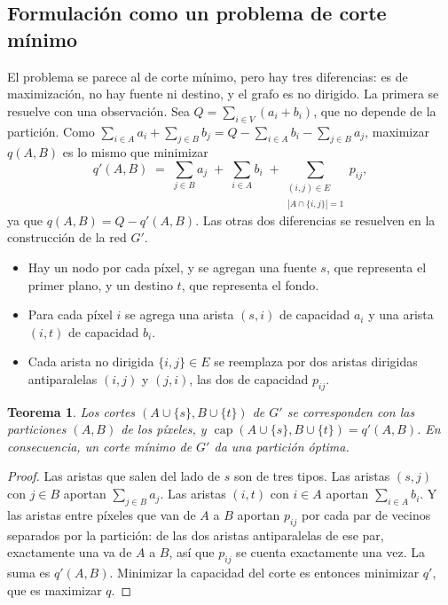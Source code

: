 \documentclass[12pt, spanish, oneside, openany]{book}
\theoremstyle{uprightplain}
\newtheorem{teorema}{Teorema}[section]
\theoremstyle{definition}
\theoremstyle{remark}
\theoremstyle{definition}
\newcommand{\capac}{\operatorname{cap}} %
\begin{document}
\subsection{Formulación como un problema de corte mínimo}

El problema se parece al de corte mínimo, pero hay tres diferencias: es de maximización, no hay fuente ni destino, y el grafo es no dirigido. La primera se resuelve con una observación. Sea $Q=\sum_{i\in V}(a_i+b_i)$, que no depende de la partición. Como $\sum_{i\in A}a_i+\sum_{j\in B}b_j=Q-\sum_{i\in A}b_i-\sum_{j\in B}a_j$, maximizar $q(A,B)$ es lo mismo que minimizar
\[
q'(A,B)\;=\;\sum_{j\in B}a_j\;+\;\sum_{i\in A}b_i\;+\sum_{\substack{(i,j)\in E\\ |A\cap\{i,j\}|=1}}p_{ij},
\]
ya que $q(A,B)=Q-q'(A,B)$. Las otras dos diferencias se resuelven en la construcción de la red $G'$.
\begin{itemize}
    \item Hay un nodo por cada píxel, y se agregan una fuente $s$, que representa el primer plano, y un destino $t$, que representa el fondo.
    \item Para cada píxel $i$ se agrega una arista $(s,i)$ de capacidad $a_i$ y una arista $(i,t)$ de capacidad $b_i$.
    \item Cada arista no dirigida $\{i,j\}\in E$ se reemplaza por dos aristas dirigidas antiparalelas $(i,j)$ y $(j,i)$, las dos de capacidad $p_{ij}$.
\end{itemize}

\begin{teorema}
\label{teo:flujo-segmentacion}
Los cortes $(A\cup\{s\},B\cup\{t\})$ de $G'$ se corresponden con las particiones $(A,B)$ de los píxeles, y $\capac(A\cup\{s\},B\cup\{t\})=q'(A,B)$. En consecuencia, un corte mínimo de $G'$ da una partición óptima.
\end{teorema}
\begin{proof}
Las aristas que salen del lado de $s$ son de tres tipos. Las aristas $(s,j)$ con $j\in B$ aportan $\sum_{j\in B}a_j$. Las aristas $(i,t)$ con $i\in A$ aportan $\sum_{i\in A}b_i$. Y las aristas entre píxeles que van de $A$ a $B$ aportan $p_{ij}$ por cada par de vecinos separados por la partición: de las dos aristas antiparalelas de ese par, exactamente una va de $A$ a $B$, así que $p_{ij}$ se cuenta exactamente una vez. La suma es $q'(A,B)$. Minimizar la capacidad del corte es entonces minimizar $q'$, que es maximizar $q$.
\end{proof}
\end{document}
